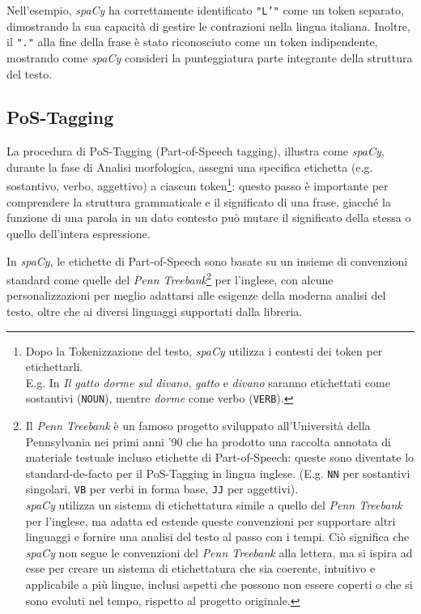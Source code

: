 \documentclass[12pt]{report}
\newcommand{\spacy}{\textsl{spaCy}\xspace}
\begin{document}
\noindent Nell'esempio, \spacy ha correttamente identificato \texttt{"L'"} come un token separato, dimostrando la sua capacità di gestire le contrazioni nella lingua italiana. Inoltre, il \texttt{"."} alla fine della frase è stato riconosciuto come un token indipendente, mostrando come \spacy consideri la punteggiatura parte integrante della struttura del testo.


\subsection{PoS-Tagging}
La procedura di PoS-Tagging (Part-of-Speech tagging), illustra come \spacy, durante la fase di \textsf{Analisi morfologica}, assegni una specifica etichetta (e.g. sostantivo, verbo, aggettivo) a ciascun token\footnote{Dopo la Tokenizzazione del testo, \spacy utilizza i contesti dei token per etichettarli.\\
E.g. In \textit{Il gatto dorme sul divano}, \textit{gatto} e \textit{divano} saranno etichettati come sostantivi (\texttt{NOUN}), mentre \textit{dorme} come verbo (\texttt{VERB}).}: questo passo è importante per comprendere la struttura grammaticale e il significato di una frase, giacché la funzione di una parola in un dato contesto può mutare il significato della stessa o quello dell'intera espressione.

In \spacy, le etichette di Part-of-Speech sono basate su un insieme di convenzioni standard come quelle del \textit{Penn Treebank}\footnote{Il \textit{Penn Treebank} è un famoso progetto sviluppato all'Università della Pennsylvania nei primi anni '90 che ha prodotto una raccolta annotata di materiale testuale incluso etichette di Part-of-Speech: queste sono diventate lo standard-de-facto per il PoS-Tagging in lingua inglese. (E.g. \texttt{NN} per sostantivi singolari, \texttt{VB} per verbi in forma base, \texttt{JJ} per aggettivi).\\
\spacy utilizza un sistema di etichettatura simile a quello del \textit{Penn Treebank} per l'inglese, ma adatta ed estende queste convenzioni per supportare altri linguaggi e fornire una analisi del testo al passo con i tempi. Ciò significa che \spacy non segue le convenzioni del \textit{Penn Treebank} alla lettera, ma si ispira ad esse per creare un sistema di etichettatura che sia coerente, intuitivo e applicabile a più lingue, inclusi aspetti che possono non essere coperti o che si sono evoluti nel tempo, rispetto al progetto originale.} per l'inglese, con alcune personalizzazioni per meglio adattarsi alle esigenze della moderna analisi del testo, oltre che ai diversi linguaggi supportati dalla libreria.
\end{document}
